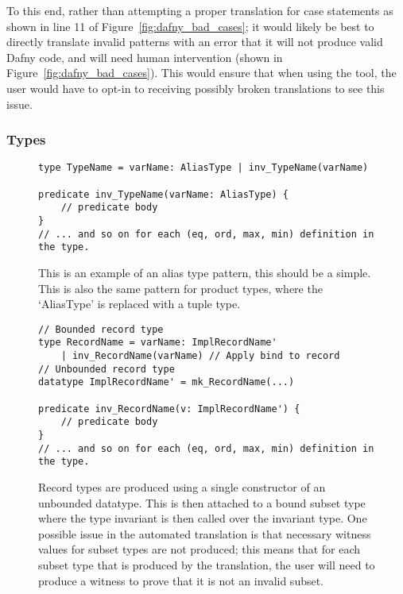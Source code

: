 \documentclass{entcs}
\begin{document}
To this end, rather than attempting a proper translation for case statements as shown in line 11 of Figure~\ref{fig:dafny_bad_cases}; it would likely be best to directly translate invalid patterns with an error that it will not produce valid Dafny code, and will need human intervention (shown in Figure~\ref{fig:dafny_bad_cases}). This would ensure that when using the tool, the user would have to opt-in to receiving possibly broken translations to see this issue. 

\subsubsection{Types}\label{section:types}

\begin{figure}[h]
	\begin{center}
        \begin{lstlisting}
type TypeName = varName: AliasType | inv_TypeName(varName)

predicate inv_TypeName(varName: AliasType) {
    // predicate body
}
// ... and so on for each (eq, ord, max, min) definition in the type. 
        \end{lstlisting}
		\caption{This is an example of an alias type pattern, this should be a simple. This is also the same pattern for product types, where the `AliasType' is replaced with a tuple type.}\label{fig:dafny_alias}
	\end{center}
\end{figure}

\begin{figure}[h]
	\begin{center}
        \begin{lstlisting}
// Bounded record type
type RecordName = varName: ImplRecordName' 
    | inv_RecordName(varName) // Apply bind to record
// Unbounded record type
datatype ImplRecordName' = mk_RecordName(...)

predicate inv_RecordName(v: ImplRecordName') {
    // predicate body
}
// ... and so on for each (eq, ord, max, min) definition in the type. 

        \end{lstlisting}
		\caption{Record types are produced using a single constructor of an unbounded datatype. This is then attached to a bound subset type where the type invariant is then called over the invariant type. One possible issue in the automated translation is that necessary witness values for subset types are not produced; this means that for each subset type that is produced by the translation, the user will need to produce a witness to prove that it is not an invalid subset.}\label{fig:dafny_record}
	\end{center}
\end{figure}
\end{document}
